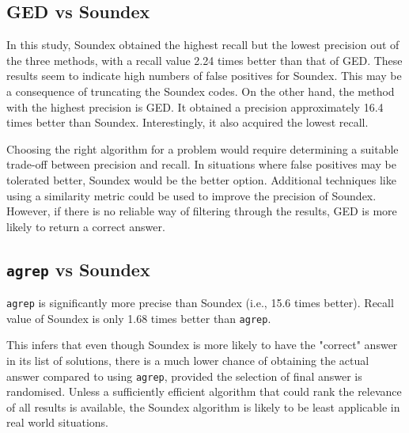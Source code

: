 \documentclass[11pt]{article}
\begin{document}

 
\subsection{GED vs Soundex}
In this study, Soundex obtained the highest recall but the lowest precision out of the three methods, with a recall value 2.24 times better than that of GED. These results seem to indicate high numbers of false positives for Soundex. This may be a consequence of truncating the Soundex codes.
On the other hand, the method with the highest precision is GED. It obtained a precision approximately 16.4 times better than Soundex. Interestingly, it also acquired the lowest recall. %

Choosing the right algorithm for a problem would require determining a suitable trade-off between precision and recall. In situations where false positives may be tolerated better, Soundex would be the better option. Additional techniques like using a similarity metric could be used to improve the precision of Soundex. %
However, if there is no reliable way of filtering through the results, GED is more likely to return a correct answer.

\subsection{\texttt{agrep} vs Soundex}
\texttt{agrep} is significantly more precise than Soundex (i.e., 15.6 times better). Recall value of Soundex is only 1.68 times better than \texttt{agrep}. 

This infers that even though Soundex is more likely to have the "correct" answer in its list of solutions, there is a much lower chance of obtaining the actual answer compared to using \texttt{agrep}, provided the selection of final answer is randomised. Unless a sufficiently efficient algorithm that could rank the relevance of all results is available, the Soundex algorithm is likely to be least applicable in real world situations.


\end{document}
